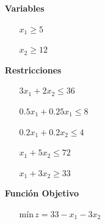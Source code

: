 \documentclass[a4paper,12pt]{article}
\begin{document}
\begin{itemize}

\item[\textbf{Variables}]
	\begin{itemize}
		\item[] $x_1 \geq 5$
		\item[] $x_2 \geq 12$
	\end{itemize}
	
\item[\textbf{Restricciones}]

\begin{itemize}

		\item[] $3x_1 + 2x_2 \leq 36$
		\item[] $0.5x_1 + 0.25x_1 \leq 8$
		\item[] $0.2x_1 + 0.2x_2 \leq 4$
		\item[] $x_1 + 5x_2 \leq 72$
		\item[] $x_1 + 3x_2 \geq 33$


\end{itemize}
	
	
\item[\textbf{Funci\'on Objetivo}]
	\begin{itemize}
			\item[] $\text{m\'in}\,z = 33 - x_1 - 3x_2$
	\end{itemize}
\end{itemize}
\end{document}
